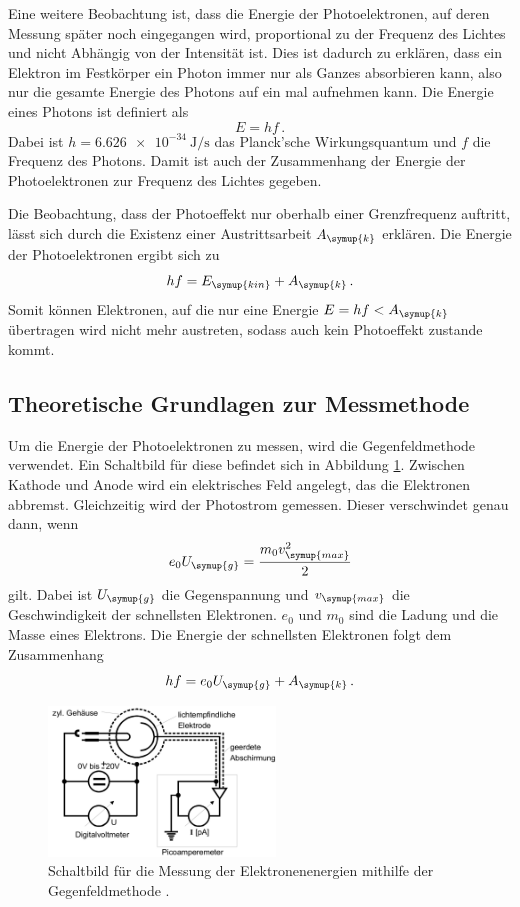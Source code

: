 Eine weitere Beobachtung ist, dass die Energie der Photoelektronen, auf deren Messung später noch
eingegangen wird, proportional zu der Frequenz des Lichtes und nicht Abhängig von der
Intensität ist. Dies ist dadurch zu erklären, dass ein Elektron im Festkörper ein Photon
immer nur als Ganzes absorbieren kann, also nur die gesamte Energie des Photons auf ein mal
aufnehmen kann. Die Energie eines Photons ist definiert als
\begin{equation}
  E=h f \,.
\end{equation}
Dabei ist $h=\SI{6.626e-34}{\joule\per\second}$ das Planck'sche Wirkungsquantum
und $f$ die Frequenz des Photons.
Damit ist auch der Zusammenhang der Energie der Photoelektronen zur Frequenz des Lichtes gegeben.

Die Beobachtung, dass der Photoeffekt nur oberhalb einer Grenzfrequenz auftritt, lässt sich
durch die Existenz einer Austrittsarbeit $A_{\symup{k}}$ erklären. Die Energie der
Photoelektronen ergibt sich zu
\begin{equation}
  h f= E_{\symup{kin}}+A_{\symup{k}} \,.
\end{equation}
Somit können Elektronen, auf die nur eine Energie $E=hf<A_{\symup{k}}$ übertragen wird
nicht mehr austreten, sodass auch kein Photoeffekt zustande kommt.

\subsection{Theoretische Grundlagen zur Messmethode}
\label{subsec:Theorie_Messung}

Um die Energie der Photoelektronen zu messen, wird die Gegenfeldmethode verwendet. Ein
Schaltbild für diese befindet sich in Abbildung \ref{fig:schaltbild}. Zwischen
Kathode und Anode wird ein elektrisches Feld angelegt, das die Elektronen abbremst.
Gleichzeitig wird der Photostrom gemessen. Dieser verschwindet genau dann, wenn
\begin{equation}
  e_0 U_{\symup{g}}=\frac{m_0 v_{\symup{max}}^2}{2}
\end{equation}
gilt. Dabei ist $U_{\symup{g}}$ die Gegenspannung und $v_{\symup{max}}$ die
Geschwindigkeit der schnellsten Elektronen. $e_0$ und $m_0$ sind die Ladung und die
Masse eines Elektrons. Die Energie der schnellsten Elektronen folgt dem Zusammenhang
\begin{equation}
  h f=e_0 U_{\symup{g}} + A_{\symup{k}} \,.
  \label{eqn:hfeUA}
\end{equation}

\begin{figure}
  \centering
  \includegraphics[height=4cm]{data/schaltbild.png}
  \caption{Schaltbild für die Messung der Elektronenenergien mithilfe der Gegenfeldmethode \cite{Versuchsanleitung}.}
  \label{fig:schaltbild}
\end{figure}

